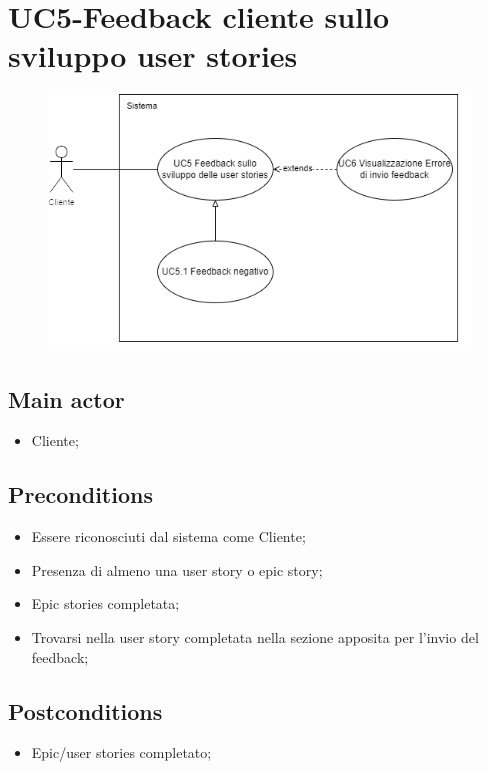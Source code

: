 \documentclass{article}
\begin{document}
\section{UC5-Feedback cliente sullo sviluppo user stories}
    \begin{figure}[h]
      \centering
      \includegraphics{./imgUML/UC5.png}
      \label{fig:immagine}
    \end{figure}
    
    \subsection*{Main actor}
    \begin{itemize}
        \item Cliente;
    \end{itemize}
    
    \subsection*{Preconditions}
    \begin{itemize}
        \item Essere riconosciuti dal sistema come Cliente;
        \item Presenza di almeno una user story o epic story;
        \item Epic stories completata;
        \item Trovarsi nella user story completata nella sezione apposita per l'invio del feedback;
    \end{itemize}
    
    \subsection*{Postconditions}
    \begin{itemize}
        \item Epic/user stories completato;
    \end{itemize}
    
\end{document}
